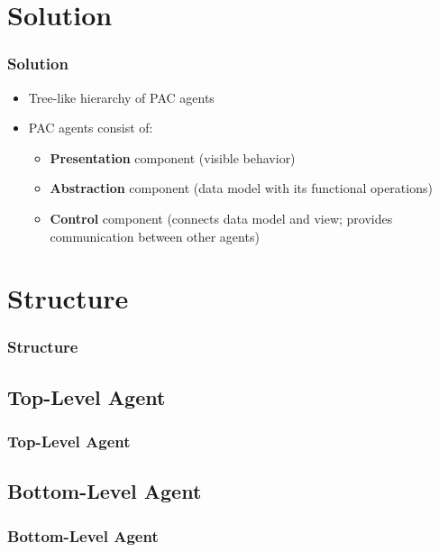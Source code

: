 \documentclass{beamer}
\begin{document}
\section{Solution}

\begin{frame}
\frametitle{Solution}

 \begin{itemize}
  \item Tree-like hierarchy of PAC agents
  \item PAC agents consist of:
  \begin{itemize}
   \item \textbf{Presentation} component (visible behavior)
   \item \textbf{Abstraction} component (data model with its functional operations)
   \item \textbf{Control} component (connects data model and view; provides communication
between other agents)
  \end{itemize}
 \end{itemize}

 
\end{frame}


\section{Structure}

\begin{frame}
 \frametitle{Structure}
 
\end{frame}


\subsection{Top-Level Agent}

\begin{frame}
 \frametitle{Top-Level Agent}
 
\end{frame}

\subsection{Bottom-Level Agent}

\begin{frame}
 \frametitle{Bottom-Level Agent}
 
\end{frame}
\end{document}
